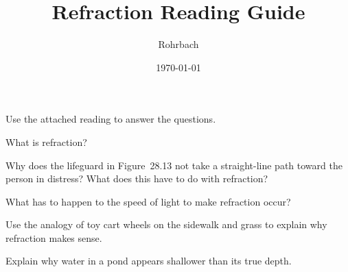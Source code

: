 \documentclass[10pt]{exam}
\title{Refraction Reading Guide}
\author{Rohrbach}
\date{\today}
\begin{document}
\maketitle

\noindent
Use the attached reading to answer the questions.

\begin{questions}

\question
  What is refraction? \vs

\question
  Why does the lifeguard in Figure~28.13 not take a straight-line path toward the person in distress?  What does this have to do with refraction? \vs 

\question
  What has to happen to the speed of light to make refraction occur? \vs 

\question
  Use the analogy of toy cart wheels on the sidewalk and grass to explain why refraction makes sense. \vs 

\question
  Explain why water in a pond appears shallower than its true depth. \vs 

\end{questions}
\end{document}
